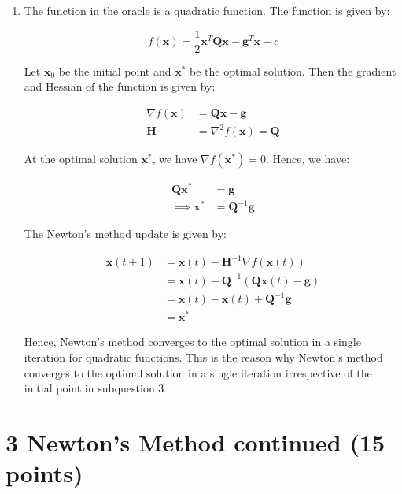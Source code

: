 \documentclass[12pt,a4paper]{article}
\theoremstyle{remark}
\begin{document}
\begin{enumerate}
    \item The function in the oracle is a quadratic function. The function is given by:
    
    \begin{equation*}
        f(\mathbf{x}) = \frac{1}{2} \mathbf{x}^T \mathbf{Q} \mathbf{x} - \mathbf{g}^T \mathbf{x} + c
    \end{equation*}

    Let $\mathbf{x}_0$ be the initial point and $\mathbf{x}^*$ be the optimal solution. Then the gradient and Hessian of the function is given by:

    \begin{align*}
        \nabla f(\mathbf{x}) &= \mathbf{Q} \mathbf{x} - \mathbf{g} \\
        \mathbf{H} &= \nabla^2 f(\mathbf{x}) = \mathbf{Q}
    \end{align*}

    At the optimal solution $\mathbf{x}^*$, we have $\nabla f(\mathbf{x}^*) = 0$. Hence, we have:

    \begin{align*}
        \mathbf{Q} \mathbf{x}^* &= \mathbf{g} \\
        \implies \mathbf{x}^* &= \mathbf{Q}^{-1} \mathbf{g}
    \end{align*}

    The Newton's method update is given by:

    \begin{align*}
        \mathbf{x}(t+1) &= \mathbf{x}(t) - \mathbf{H}^{-1} \nabla f(\mathbf{x}(t)) \\
        &= \mathbf{x}(t) - \mathbf{Q}^{-1} (\mathbf{Q} \mathbf{x}(t) - \mathbf{g}) \\
        &= \mathbf{x}(t) - \mathbf{x}(t) + \mathbf{Q}^{-1} \mathbf{g} \\
        &= \mathbf{x}^*
    \end{align*}

    Hence, Newton's method converges to the optimal solution in a single iteration for quadratic functions. This is the reason why Newton's method converges to the optimal solution in a single iteration irrespective of the initial point in subquestion 3.
\end{enumerate}

\section*{3 Newton's Method continued (15 points)}
\end{document}
